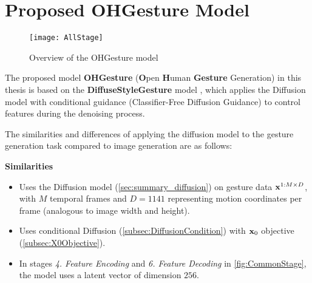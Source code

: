 \pagebreak

\section{Proposed OHGesture Model}
\label{sec:ohgesture}

\begin{figure}[H]
	\centering
		\texttt{[image: AllStage]}
	\caption{Overview of the OHGesture model}
	\label{fig:TrainingAndSampling}
\end{figure}

The proposed model \textbf{OHGesture} (\textbf{O}pen \textbf{H}uman \textbf{Gesture} Generation) in this thesis is based on the \textbf{DiffuseStyleGesture} model \cite{yang2023diffusestylegesture}, which applies the Diffusion model \cite{ho2020denoising} with conditional guidance \cite{ho2022classifier} (Classifier-Free Diffusion Guidance) to control features during the denoising process.

The similarities and differences of applying the diffusion model to the gesture generation task compared to image generation are as follows:

\vspace{10pt}

\textbf{Similarities}
\begin{itemize}
	\item Uses the Diffusion model (\autoref{sec:summary_diffusion}) on gesture data $\mathbf{x}^{1:M \times D}$, with $M$ temporal frames and $D=1141$ representing motion coordinates per frame (analogous to image width and height).
	\item Uses conditional Diffusion (\autoref{subsec:DiffusionCondition}) with $\mathbf{x}_0$ objective (\autoref{subsec:X0Objective}).
	\item In stages \textit{4. Feature Encoding} and \textit{6. Feature Decoding} in \autoref{fig:CommonStage}, the model uses a latent vector of dimension $256$.
\end{itemize}

